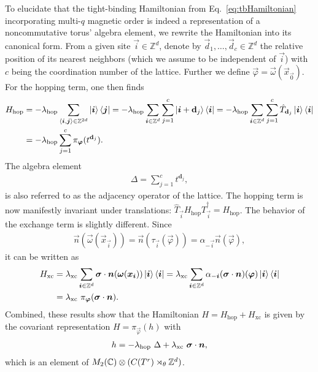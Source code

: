 \documentclass[submission, Phys]{SciPost}
\begin{document}
To elucidate that the tight-binding Hamiltonian from Eq.~\eqref{eq:tbHamiltonian} incorporating multi-$q$ magnetic order is indeed a representation of a noncommutative torus' algebra element, we rewrite the Hamiltonian into its canonical form.
From a given site $\vec{i} \in \mathbb{Z}^d$, denote by $\vec{d}_1, \ldots, \vec{d}_c \in \mathbb{Z}^d$ the relative position of its nearest neighbors (which we assume to be independent of $\vec{i}$) with $c$ being the coordination number of the lattice.
Further we define $\vec{\varphi} = \vec{\omega}(\vec{x}_{\vec{0}})$.
For the hopping term, one then finds
\begin{align}
H_\mathrm{hop}  &= - \lambda_\mathrm{hop} \sum_{\braket{\boldsymbol{i},\boldsymbol{j}} \in \mathbb{Z}^{2d}} \ket{\boldsymbol{i}}\bra{\boldsymbol{j}}
= - \lambda_\mathrm{hop}  \sum_{\boldsymbol{i} \in \mathbb{Z}^{d}}  \sum_{j=1}^c  \ket{\boldsymbol{i}+\mathbf{d}_j}\bra{\boldsymbol{i}}
= - \lambda_\mathrm{hop}  \sum_{\boldsymbol{i} \in \mathbb{Z}^{d}}  \sum_{j=1}^c   \hat{T}_{\mathbf{d}_j }\ket{\boldsymbol{i}}\bra{\boldsymbol{i}} 
\notag\\&
= - \lambda_\mathrm{hop}   \sum_{j=1}^c  \pi_{\boldsymbol{\varphi}} ( t^{\mathbf{d}_j } ). 
\end{align}
The algebra element
\begin{align}
    \Delta = \sum_{j=1}^c   t^{\mathbf{d}_j },
\end{align}
is also referred to as the adjacency operator of the lattice.
The hopping term is now manifestly invariant under translations:  $\hat{T}_{\vec{i}} H_\mathrm{hop}\hat{T}_{\vec{i}}^\dagger = H_\mathrm{hop}$.
The behavior of the exchange term is slightly different. 
Since
\begin{align}
    \vec{n}(\vec{\omega}( \vec{x}_{\vec{i}})) 
    =\vec{n}(\tau_{\vec{i} }( \vec{\varphi} ))
    =\alpha_{-\vec{i}}\vec{n}(\vec{\varphi}) ,
\end{align}
it can be written as 
\begin{align}
H_\mathrm{xc}
	&= \lambda_\mathrm{xc}\sum_{\boldsymbol{i} \in \mathbb{Z}^d} \boldsymbol{\sigma} \cdot \boldsymbol{n}(\boldsymbol{\omega}( \boldsymbol{x}_{\boldsymbol{i}}))   \ket{\boldsymbol{i}}\bra{\boldsymbol{i}} 
 = \lambda_\mathrm{xc}\sum_{\boldsymbol{i} \in \mathbb{Z}^d} \alpha_{-\boldsymbol{i}}(\boldsymbol{\sigma} \cdot \boldsymbol{n})(\boldsymbol{\varphi})   \ket{\boldsymbol{i}}\bra{\boldsymbol{i}}
 \notag \\
&= \lambda_\mathrm{xc} ~\pi_{\boldsymbol{\varphi}} ( \boldsymbol{\sigma} \cdot \boldsymbol{n} ).
\end{align}
Combined, these results show that the Hamiltonian  $H=H_\mathrm{hop} + H_\mathrm{xc}$ is given by the covariant representation $H= \pi_{\vec{\varphi}} (h)$
with
\begin{align}
    h = -\lambda_\mathrm{hop}~\Delta + \lambda_\mathrm{xc}~\boldsymbol{\sigma} \cdot \boldsymbol{n}  ,
    \label{eq:nct_hamiltonian}
\end{align}
which is an element of $M_2(\mathbb{C})\otimes ( C(T^r)\rtimes_{\theta} \mathbb{Z}^d)$.
\end{document}
